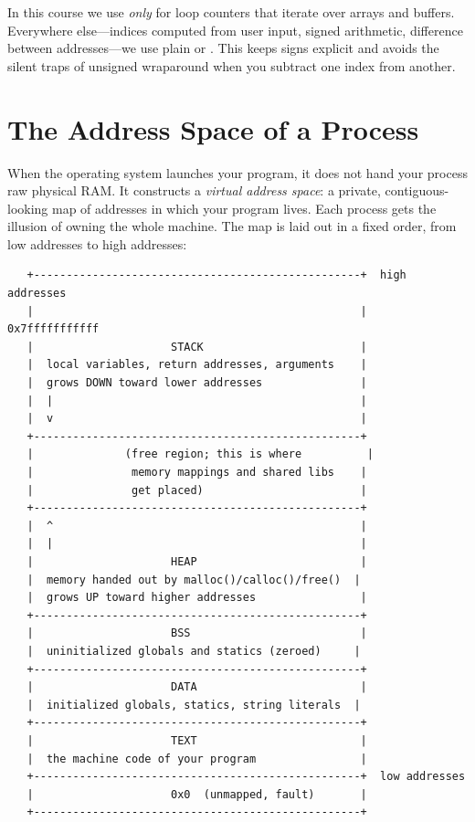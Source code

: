 \begin{ruleofthumb}
In this course we use  \emph{only} for loop counters that
iterate over arrays and buffers. Everywhere else---indices computed from
user input, signed arithmetic, difference between addresses---we use
plain  or . This keeps signs explicit and avoids
the silent traps of unsigned wraparound when you subtract one index from
another.
\end{ruleofthumb}

\section{The Address Space of a Process}

When the operating system launches your program, it does not hand your
process raw physical RAM. It constructs a \emph{virtual address space}:
a private, contiguous-looking map of addresses in which your program
lives. Each process gets the illusion of owning the whole machine. The
map is laid out in a fixed order, from low addresses to high addresses:

\begin{verbatim}
   +--------------------------------------------------+  high addresses
   |                                                  |  0x7fffffffffff
   |                     STACK                        |
   |  local variables, return addresses, arguments    |
   |  grows DOWN toward lower addresses               |
   |  |                                               |
   |  v                                               |
   +--------------------------------------------------+
   |              (free region; this is where          |
   |               memory mappings and shared libs    |
   |               get placed)                        |
   +--------------------------------------------------+
   |  ^                                               |
   |  |                                               |
   |                     HEAP                         |
   |  memory handed out by malloc()/calloc()/free()  |
   |  grows UP toward higher addresses                |
   +--------------------------------------------------+
   |                     BSS                          |
   |  uninitialized globals and statics (zeroed)     |
   +--------------------------------------------------+
   |                     DATA                         |
   |  initialized globals, statics, string literals  |
   +--------------------------------------------------+
   |                     TEXT                         |
   |  the machine code of your program                |
   +--------------------------------------------------+  low addresses
   |                     0x0  (unmapped, fault)       |
   +--------------------------------------------------+
\end{verbatim}

